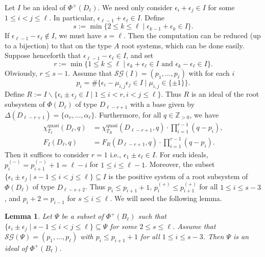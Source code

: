 \documentclass[12pt]{amsart}
\theoremstyle{plain}
\newtheorem{lemma}[theorem]{Lemma}
\theoremstyle{definition}
\theoremstyle{remark}
\newcommand{\Z}{\mathbb{Z}}
\newcommand{\quasi}{\operatorname{quasi}}
\newcommand{\SG}{{\mathcal{SG}}}
\begin{document}
Let $I$ be an ideal of  $\Phi^+(D_\ell)$. 
We need only consider $\epsilon_i + \epsilon_{j} \in I$ for some $1 \le i < j \le \ell$. 
In particular, $\epsilon_{\ell-1}+\epsilon_\ell \in I$. 
Define
\begin{equation}\label{eq:s-D}
s :=\min \{ 2 \le k \le \ell \mid \epsilon_{k-1}+\epsilon_k  \in I\}.
\end{equation} 
If $\epsilon_{\ell-1}-\epsilon_{\ell}  \notin I$, we must have $s=\ell$. 
Then the computation can be reduced (up to a bijection) to that on the type $A$ root systems, which can be done easily.
Suppose henceforth that $\epsilon_{\ell-1}-\epsilon_{\ell}  \in I$, and set
\begin{equation*}\label{eq:r-D}
r :=\min \{ 1 \le k \le \ell \mid \epsilon_{k}+\epsilon_{\ell}  \in I \,\,\mbox{and}\,\, \epsilon_{k}-\epsilon_{\ell}  \in I\}.
\end{equation*} 
Obviously, $r \le s-1$. 
Assume that $\SG(I)=(p_1,\ldots,p_\ell)$ with for each $i$
\begin{equation}\label{eq:di-signed-graphs-D}
p_i = \# \{ \epsilon_i - \mu_{i,j}\epsilon_{j} \in I \mid \mu_{i,j} \in \{\pm1\}\}.
\end{equation} 
Define $R:=I \smallsetminus \{ \epsilon_i \pm\epsilon_{j} \in I \mid 1\le i<r, i <j \le \ell\}$. 
Thus $R$ is an ideal of the root subsystem of $\Phi(D_\ell)$ of  type $D_{\ell-r+1}$ with a base given by $\Delta(D_{\ell-r+1})=\{\alpha_r,\ldots,\alpha_\ell\}$. 
Furthermore, for all $q \in \Z_{>0}$, we have
\begin{equation*}\label{eq:inductive-D}
\begin{aligned}
\chi^{\quasi}_{T_I}(D_\ell, q) & =\chi^{\quasi}_{T_R}(D_{\ell-r+1}, q)\cdot \prod_{i=1}^{r-1}(q-p_i),\\
F_I(D_\ell, q) &= F_R(D_{\ell-r+1}, q)\cdot \prod_{i=1}^{r-1}(q-p_i).
\end{aligned}
\end{equation*}
Then it suffices to consider $r=1$ i.e., $\epsilon_1\pm\epsilon_{\ell}  \in I$. 
For such ideals, $p_{i}^{(-)} = p_{i+1}^{(-)}+1=\ell-i$ for $1 \le i \le \ell-1$.
Moreover, the subset $\{ \epsilon_i \pm \epsilon_{j} \mid s-1 \le i<j \le \ell\}\subseteq I$ is the positive system of a root subsystem of $\Phi(D_\ell)$ of type $D_{\ell-s+2}$. 
Thus $p_i \le p_{i+1}+1$, $p_{i}^{(+)} \le p_{i+1}^{(+)}$ for all $1 \le i \le s-3$, and $p_i+2=p_{i-1}$ for $s \le i \le \ell$. 
We will need the following lemma.

 \begin{lemma}
 \label{lem:needed-B}
Let $\Psi$ be a subset of $\Phi^+(B_\ell)$ such that $\{ \epsilon_i \pm \epsilon_{j} \mid s-1 \le i<j \le \ell\}\subseteq \Psi$ for some $2 \le s \le \ell$. 
Assume that $\SG(\Psi)=(p_1,\ldots,p_\ell)$ with  $p_i  \le p_{i+1}+1$ for all $1 \le i \le s-3$.
Then $\Psi$ is an ideal of $\Phi^+(B_{\ell})$.
\end{lemma} 
\end{document}
